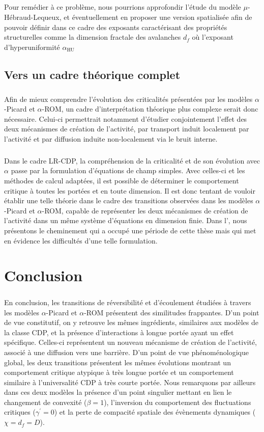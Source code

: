 \subparagraph{}Pour remédier à ce problème, nous pourrions approfondir l'étude du modèle $\mu$-Hébraud-Lequeux, et éventuellement en proposer une version spatialisée afin de pouvoir définir dans ce cadre des exposants caractérisant des propriétés structurelles comme la dimension fractale des avalanches $d_f$ où l'exposant d'hyperuniformité $\alpha_\text{HU}$

\subsection{Vers un cadre théorique complet}

\subparagraph{}Afin de mieux comprendre l'évolution des criticalités présentées par les modèles $\alpha$-Picard et $\alpha$-ROM, un cadre d'interprétation théorique plus complexe serait donc nécessaire. Celui-ci permettrait notamment d'étudier conjointement l'effet des deux mécanismes de création de l'activité, par transport induit localement par l'activité et par diffusion induite non-localement via le bruit interne. 

\subparagraph{}Dans le cadre LR-CDP, la compréhension de la criticalité et de son évolution avec $\alpha$ passe par la formulation d'équations de champ simples. Avec celles-ci et les méthodes de calcul adaptées, il est possible de déterminer le comportement critique à toutes les portées et en toute dimension. Il est donc tentant de vouloir établir une telle théorie dans le cadre des transitions observées dans les modèles $\alpha$-Picard et $\alpha$-ROM, capable de représenter les deux mécanismes de création de l'activité dans un même système d'équations en dimension finie. Dans l', nous présentons le cheminement qui a occupé une période de cette thèse mais qui met en évidence les difficultés d'une telle formulation.

\section{Conclusion}

\subparagraph{}En conclusion, les transitions de réversibilité et d'écoulement étudiées à travers les modèles $\alpha$-Picard et $\alpha$-ROM présentent des similitudes frappantes. D'un point de vue constitutif, on y retrouve les mêmes ingrédients, similaires aux modèles de la classe CDP, et la présence d'interactions à longue portée ayant un effet spécifique. Celles-ci représentent un nouveau mécanisme de création de l'activité, associé à une diffusion vers une barrière. D'un point de vue phénoménologique global, les deux transitions présentent les mêmes évolutions montrant un comportement critique atypique à très longue portée et un comportement similaire à l'universalité CDP à très courte portée. Nous remarquons par ailleurs dans ces deux modèles la présence d'un point singulier mettant en lien le changement de convexité ($\beta = 1$), l'inversion du comportement des fluctuations critiques ($\gamma^\prime = 0$) et la perte de compacité spatiale des évènements dynamiques ($\chi = d_f = D$).



